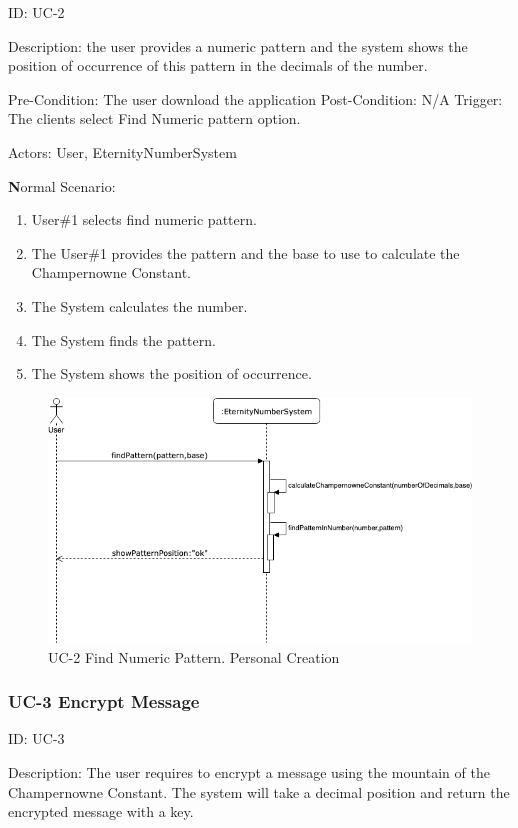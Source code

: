 \documentclass{report}
\begin{document}
ID: UC-2

Description: the user provides a numeric pattern and the system shows the position of occurrence of this pattern in the decimals of the number.

Pre-Condition: The user download the application
Post-Condition: N/A
Trigger: The clients select Find Numeric pattern option.

Actors: User, EternityNumberSystem

\textbf Normal Scenario:
\begin{enumerate}
\item User\#1 selects find numeric pattern.
\item The User\#1 provides the pattern and the base to use to calculate the Champernowne Constant.
\item The System calculates the number.
\item The System finds the pattern.
\item The System shows the position of occurrence.
\newline
\end{enumerate}

\begin{figure}[H]
\includegraphics[scale=0.75]{images/findPattern.png}
\caption[UC-2 Find Numeric Pattern]{UC-2 Find Numeric Pattern. Personal Creation}
\end{figure}

\subsubsection{UC-3 Encrypt Message}

ID: UC-3

Description: The user requires to encrypt a message using the mountain of the Champernowne Constant. The system will take a decimal position and return the encrypted message with a key.
\end{document}

